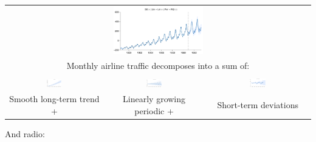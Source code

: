 \documentclass[portrait,a0b,final,a4resizeable]{a0poster}
\newenvironment{poster}{
  \begin{center}
  \begin{minipage}[c]{0.95\textwidth}
}{
  \end{minipage} 
  \end{center}
}
\begin{document}
\begin{poster}
\begin{multicols}{2}
\begin{tabular}{ccc}
\multicolumn{3}{c}{\includegraphics[width=0.3\textwidth]{../figures/01-airline-months_all.pdf}} \\
\multicolumn{3}{c}{Monthly airline traffic decomposes into a sum of:} \\ \\
\includegraphics[width=0.16\textwidth]{../figures/01-airline-months_1.pdf} &
\includegraphics[width=0.16\textwidth]{../figures/01-airline-months_2.pdf} &
\includegraphics[width=0.16\textwidth]{../figures/01-airline-months_3.pdf} \\
Smooth long-term trend + \quad &
Linearly growing periodic + \quad &
Short-term deviations
\end{tabular}

And radio:


\end{multicols}
\end{poster}
\end{document}
